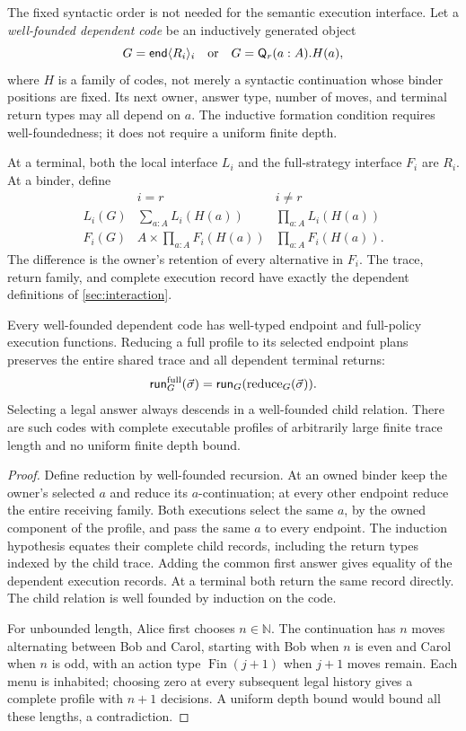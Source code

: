 The fixed syntactic order is not needed for the semantic execution
interface. Let a \emph{well-founded dependent code} be an inductively
generated object
\[
 G=\mathsf{end}\langle R_i\rangle_i
 \quad\text{or}\quad G=\mathsf Q_r(a:A).H(a),
\]
where $H$ is a family of codes, not merely a syntactic continuation
whose binder positions are fixed. Its next owner, answer type, number
of moves, and terminal return types may all depend on $a$. The inductive
formation condition requires well-foundedness; it does not require a
uniform finite depth.

At a terminal, both the local interface $L_i$ and the full-strategy
interface $F_i$ are $R_i$. At a binder, define
\[
\begin{array}{c|cc}
 &i=r&i\ne r\\\hline
 L_i(G)&\displaystyle\sum_{a:A}L_i(H(a))
       &\displaystyle\prod_{a:A}L_i(H(a))\\[3pt]
 F_i(G)&\displaystyle A\times\prod_{a:A}F_i(H(a))
       &\displaystyle\prod_{a:A}F_i(H(a)).
\end{array}
\]
The difference is the owner's retention of every alternative in $F_i$.
The trace, return family, and complete execution record have exactly
the dependent definitions of \cref{sec:interaction}.

\begin{theorem}\label{dep:thm:dynamic-execution}
Every well-founded dependent code has well-typed endpoint and full-policy
execution functions. Reducing a full profile to its selected endpoint plans
preserves the entire shared trace and all dependent terminal returns:
\[
 \mathsf{run}_G^{\rm full}(\vec\sigma)
   =\mathsf{run}_G(\operatorname{reduce}_G(\vec\sigma)).
\]
Selecting a legal answer always descends in a well-founded child
relation. There are such codes with complete executable profiles of
arbitrarily large finite trace length and no uniform finite depth bound.
\end{theorem}
\begin{proof}
Define reduction by well-founded recursion. At an owned binder keep
the owner's selected $a$ and reduce its $a$-continuation; at every
other endpoint reduce the entire receiving family. Both executions
select the same $a$, by the owned component of the profile, and pass
the same $a$ to every endpoint. The induction hypothesis equates their
complete child records, including the return types indexed by the
child trace. Adding the common first answer gives equality of the
dependent execution records. At a terminal both return the same
record directly. The child relation is well founded by induction on
the code.

For unbounded length, Alice first chooses $n\in\mathbb N$. The
continuation has $n$ moves alternating between Bob and Carol, starting
with Bob when $n$ is even and Carol when $n$ is odd, with
an action type $\operatorname{Fin}(j+1)$ when $j+1$ moves remain.
Each menu is inhabited; choosing zero at every subsequent legal
history gives a complete profile with $n+1$ decisions. A uniform
depth bound would bound all these lengths, a contradiction.
\end{proof}

